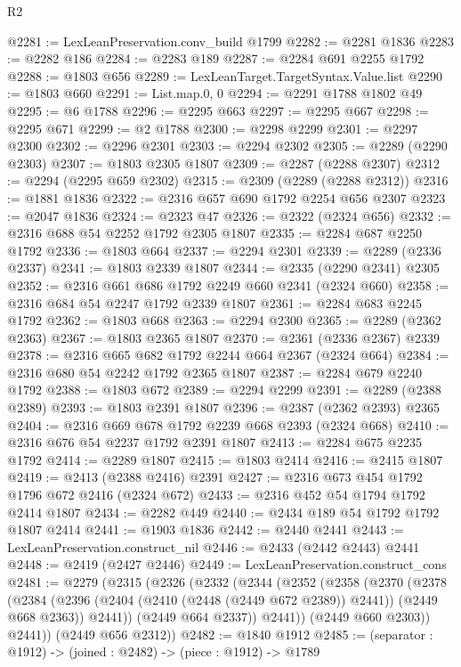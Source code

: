 \begin{lexlean}{R2}
\begin{coremodule}
@2281 := LexLeanPreservation.conv_build @1799
@2282 := @2281 @1836
@2283 := @2282 @186
@2284 := @2283 @189
@2287 := @2284 @691 @2255 @1792
@2288 := @1803 @656
@2289 := LexLeanTarget.TargetSyntax.Value.list
@2290 := @1803 @660
@2291 := List.map.{0, 0}
@2294 := @2291 @1788 @1802 @49
@2295 := @6 @1788
@2296 := @2295 @663
@2297 := @2295 @667
@2298 := @2295 @671
@2299 := @2 @1788
@2300 := @2298 @2299
@2301 := @2297 @2300
@2302 := @2296 @2301
@2303 := @2294 @2302
@2305 := @2289 (@2290 @2303)
@2307 := @1803 @2305 @1807
@2309 := @2287 (@2288 @2307)
@2312 := @2294 (@2295 @659 @2302)
@2315 := @2309 (@2289 (@2288 @2312))
@2316 := @1881 @1836
@2322 := @2316 @657 @690 @1792 @2254 @656 @2307
@2323 := @2047 @1836
@2324 := @2323 @47
@2326 := @2322 (@2324 @656)
@2332 := @2316 @688 @54 @2252 @1792 @2305 @1807
@2335 := @2284 @687 @2250 @1792
@2336 := @1803 @664
@2337 := @2294 @2301
@2339 := @2289 (@2336 @2337)
@2341 := @1803 @2339 @1807
@2344 := @2335 (@2290 @2341) @2305
@2352 := @2316 @661 @686 @1792 @2249 @660 @2341 (@2324 @660)
@2358 := @2316 @684 @54 @2247 @1792 @2339 @1807
@2361 := @2284 @683 @2245 @1792
@2362 := @1803 @668
@2363 := @2294 @2300
@2365 := @2289 (@2362 @2363)
@2367 := @1803 @2365 @1807
@2370 := @2361 (@2336 @2367) @2339
@2378 := @2316 @665 @682 @1792 @2244 @664 @2367 (@2324 @664)
@2384 := @2316 @680 @54 @2242 @1792 @2365 @1807
@2387 := @2284 @679 @2240 @1792
@2388 := @1803 @672
@2389 := @2294 @2299
@2391 := @2289 (@2388 @2389)
@2393 := @1803 @2391 @1807
@2396 := @2387 (@2362 @2393) @2365
@2404 := @2316 @669 @678 @1792 @2239 @668 @2393 (@2324 @668)
@2410 := @2316 @676 @54 @2237 @1792 @2391 @1807
@2413 := @2284 @675 @2235 @1792
@2414 := @2289 @1807
@2415 := @1803 @2414
@2416 := @2415 @1807
@2419 := @2413 (@2388 @2416) @2391
@2427 := @2316 @673 @454 @1792 @1796 @672 @2416 (@2324 @672)
@2433 := @2316 @452 @54 @1794 @1792 @2414 @1807
@2434 := @2282 @449
@2440 := @2434 @189 @54 @1792 @1792 @1807 @2414
@2441 := @1903 @1836
@2442 := @2440 @2441
@2443 := LexLeanPreservation.construct_nil
@2446 := @2433 (@2442 @2443) @2441
@2448 := @2419 (@2427 @2446)
@2449 := LexLeanPreservation.construct_cons
@2481 := @2279
    (@2315
      (@2326
        (@2332
          (@2344
            (@2352
              (@2358
                (@2370
                  (@2378
                    (@2384
                      (@2396 (@2404 (@2410 (@2448 (@2449 @672 @2389)) @2441)) (@2449 @668 @2363))
                      @2441))
                  (@2449 @664 @2337))
                @2441))
            (@2449 @660 @2303))
          @2441))
      (@2449 @656 @2312))
@2482 := @1840 @1912
@2485 := (separator : @1912) -> (joined : @2482) -> (piece : @1912) -> @1789

\end{coremodule}
\end{lexlean}
